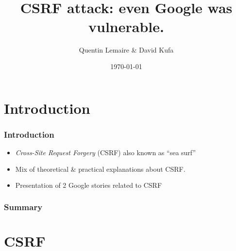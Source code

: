 \documentclass[svgnames]{beamer}
\title{CSRF attack: even Google was vulnerable.}
\author{Quentin Lemaire \& David Kufa}
\date{\today}
\begin{document}
  
\maketitle %


\section*{Introduction}
\begin{frame}
\frametitle{Introduction}
\begin{itemize}
  \item \textit{Cross-Site Request Forgery} (CSRF) also known as ``sea surf''
  \item Mix of theoretical \& practical explanations about CSRF.
  \item Presentation of 2 Google stories related to CSRF
\end{itemize}

\end{frame}


\begin{frame}
  \frametitle{Summary}
  \tableofcontents
\end{frame}


\section{CSRF}

\end{document}
